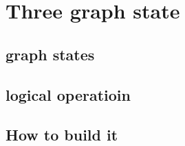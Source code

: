 \documentclass[12pt,a4paper]{report}
\begin{document}





\begingroup
    \hypersetup{linkcolor=black}
    \renewcommand\contentsname{\bfseries Contents}
    \tableofcontents
\endgroup








\chapter{Three graph state}

\section{graph states}
\section{logical operatioin}
\section{How to build it}


\printbibliography[heading=bibintoc]
\end{document}

